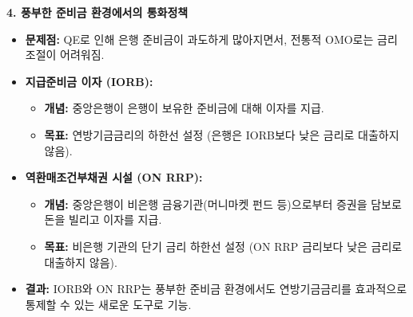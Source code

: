 \documentclass[11pt,a4paper]{article}
\theoremstyle{definition}
\begin{document}
\begin{tcolorbox}[summarybox, title=\textbf{중앙은행 통화정책 도구 요약}]
  \textbf{4. 풍부한 준비금 환경에서의 통화정책}
  \begin{itemize}
    \item \textbf{문제점:} QE로 인해 은행 준비금이 과도하게 많아지면서, 전통적 OMO로는 금리 조절이 어려워짐.
    \item \textbf{지급준비금 이자 (IORB):}
      \begin{itemize}
        \item \textbf{개념:} 중앙은행이 은행이 보유한 준비금에 대해 이자를 지급.
        \item \textbf{목표:} 연방기금금리의 하한선 설정 (은행은 IORB보다 낮은 금리로 대출하지 않음).
      \end{itemize}
    \item \textbf{역환매조건부채권 시설 (ON RRP):}
      \begin{itemize}
        \item \textbf{개념:} 중앙은행이 비은행 금융기관(머니마켓 펀드 등)으로부터 증권을 담보로 돈을 빌리고 이자를 지급.
        \item \textbf{목표:} 비은행 기관의 단기 금리 하한선 설정 (ON RRP 금리보다 낮은 금리로 대출하지 않음).
      \end{itemize}
    \item \textbf{결과:} IORB와 ON RRP는 풍부한 준비금 환경에서도 연방기금금리를 효과적으로 통제할 수 있는 새로운 도구로 기능.
  \end{itemize}
\end{tcolorbox}
\end{document}
